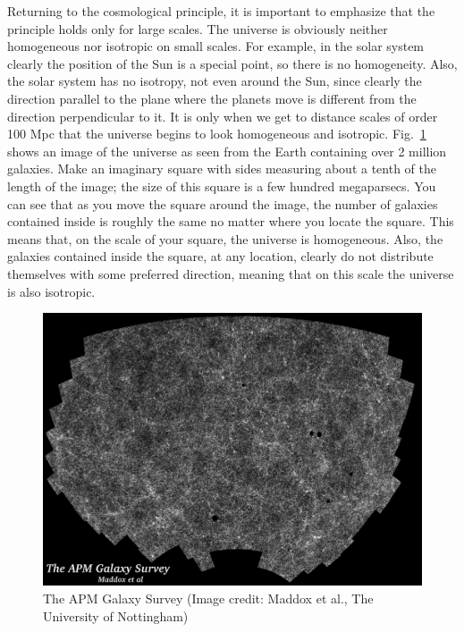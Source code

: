 Returning to the cosmological principle, it is important to emphasize that the principle holds only for large scales. The universe is obviously neither homogeneous nor isotropic on small scales. For example, in the solar system clearly the position of the Sun is a special point, so there is no homogeneity. Also, the solar system has no isotropy, not even around the Sun, since clearly the direction parallel to the plane where the planets move is different from the direction perpendicular to it. It is only when we get to distance scales of order 100 Mpc that the universe begins to look homogeneous and isotropic. Fig.\ \ref{fig:lec4_5} shows an image of the universe as seen from the Earth containing over 2 million galaxies. Make an imaginary square with sides measuring about a tenth of the length of the image; the size of this square is a few hundred megaparsecs. You can see that as you move the square around the image, the number of galaxies contained inside is roughly the same no matter where you locate the 
square. This means that, on the scale of your square, the universe is homogeneous. Also, the galaxies contained inside the square, at any location, clearly do not distribute themselves with some preferred direction, meaning that on this scale the universe is also isotropic.
\begin{figure}[ht]
\begin{center}
\includegraphics[scale=0.4]{Draw/lec4_5.png}
\end{center}
\caption{The APM Galaxy Survey (Image credit: Maddox et al., The University of Nottingham)}
\label{fig:lec4_5}
\end{figure}

